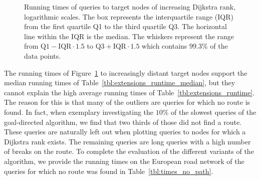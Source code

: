 \begin{figure}[hbtp]
	\centering
	\caption[Running times of queries to target nodes of increasing Dijkstra rank, logarithmic scales.]{Running times of queries to target nodes of increasing Dijkstra rank, logarithmic scales. The box represents the interquartile range (IQR) from the first quartile Q1 to the third quartile Q3. The horizontal line within the IQR is the median. The whiskers represent the range from $\text{Q1} - \text{IQR} \cdot 1.5$ to $\text{Q3} + \text{IQR} \cdot 1.5$ which contains $99.3\%$ of the data points.}
	\label{fig:rank_times}
\end{figure}

The running times of Figure~\ref{fig:rank_times} to increasingly distant target nodes support the median running times of Table~\ref{tbl:extensions_runtime_median}, but they cannot explain the high average running times of Table~\ref{tbl:extensions_runtime}. The reason for this is that many of the outliers are queries for which no route is found. In fact, when exemplary investigating the $10\%$ of the slowest queries of the goal-directed algorithm, we find that two thirds of those did not find a route. These queries are naturally left out when plotting queries to nodes for which a Dijkstra rank exists. The remaining queries are long queries with a high number of breaks on the route. To complete the evaluation of the different variants of the algorithm, we provide the running times on the European road network of the queries for which no route was found in Table~\ref{tbl:times_no_path}.

